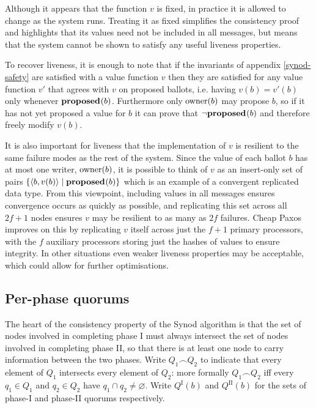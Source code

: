 \documentclass[journal]{IEEEtran}
\begin{document}
Although it appears that the function $v$ is fixed, in practice it is allowed
to change as the system runs. Treating it as fixed simplifies the consistency
proof and highlights that its values need not be included in all messages, but
means that the system cannot be shown to satisfy any useful liveness
properties.

To recover liveness, it is enough to note that if the invariants of appendix
\ref{synod-safety} are satisfied with a value function $v$ then they are
satisfied for any value function $v'$ that agrees with $v$ on proposed ballots,
i.e. having $v(b) = v'(b)$ only whenever $\mathbf{proposed}_{}(b)$.  Furthermore only
$\mathrm{owner}(b)$ may propose $b$, so if it has not yet proposed a value for $b$ it
can prove that $\neg\mathbf{proposed}_{}(b)$ and therefore freely modify $v(b)$.

It is also important for liveness that the implementation of $v$ is resilient
to the same failure modes as the rest of the system. Since the value of each
ballot $b$ has at most one writer, $\mathrm{owner}(b)$, it is possible to think of
$v$ as an insert-only set of pairs ${\{ \langle b, v(b) \rangle \mid \mathbf{proposed}_{}(b)
\}}$ which is an example of a convergent replicated data type\cite{crdts}.
From this viewpoint, including values in all messages ensures convergence
occurs as quickly as possible, and replicating this set across all ${2f+1}$
nodes ensures $v$ may be resilient to as many as $2f$ failures. Cheap Paxos
improves on this by replicating $v$ itself across just the ${f+1}$ primary
processors, with the $f$ auxiliary processors storing just the hashes of values
to ensure integrity.  In other situations even weaker liveness properties may
be acceptable, which could allow for further optimisations.

\subsection{Per-phase quorums}\label{per-phase-quorums}

The heart of the consistency property of the Synod algorithm is that the set of
nodes involved in completing phase I must always intersect the set of nodes
involved in completing phase II, so that there is at least one node to carry
information between the two phases. Write $Q_1 \frown Q_2$ to indicate that
every element of $Q_1$ intersects every element of $Q_2$: more formally $Q_1
\frown Q_2$ iff every $q_1 \in Q_1$ and $q_2 \in Q_2$ have ${q_1 \cap q_2 \ne
\varnothing}$. Write $Q^\textrm{I}(b)$ and $Q^\textrm{II}(b)$ for the sets of
phase-I and phase-II quorums respectively.
\end{document}
